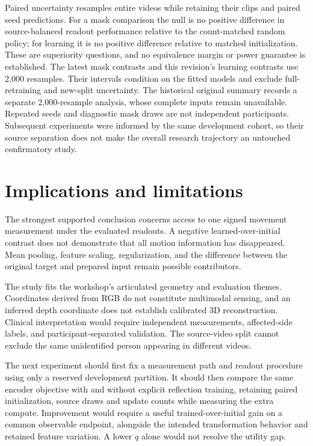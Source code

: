 \documentclass{article}
\begin{document}
Paired uncertainty resamples entire videos while retaining their clips and paired seed predictions. For a mask comparison the null is no positive difference in source-balanced readout performance relative to the count-matched random policy; for learning it is no positive difference relative to matched initialization. These are superiority questions, and no equivalence margin or power guarantee is established. The latest mask contrasts and this revision's learning contrasts use 2,000 resamples. Their intervals condition on the fitted models and exclude full-retraining and new-split uncertainty. The historical original summary records a separate 2,000-resample analysis, whose complete inputs remain unavailable. Repeated seeds and diagnostic mask draws are not independent participants. Subsequent experiments were informed by the same development cohort, so their source separation does not make the overall research trajectory an untouched confirmatory study.

\section{Implications and limitations}\label{implications-and-limitations}

The strongest supported conclusion concerns access to one signed movement measurement under the evaluated readouts. A negative learned-over-initial contrast does not demonstrate that all motion information has disappeared. Mean pooling, feature scaling, regularization, and the difference between the original target and prepared input remain possible contributors.

The study fits the workshop's articulated geometry and evaluation themes. Coordinates derived from RGB do not constitute multimodal sensing, and an inferred depth coordinate does not establish calibrated 3D reconstruction. Clinical interpretation would require independent measurements, affected-side labels, and participant-separated validation. The source-video split cannot exclude the same unidentified person appearing in different videos.

The next experiment should first fix a measurement path and readout procedure using only a reserved development partition. It should then compare the same encoder objective with and without explicit reflection training, retaining paired initialization, source draws and update counts while measuring the extra compute. Improvement would require a useful trained-over-initial gain on a common observable endpoint, alongside the intended transformation behavior and retained feature variation. A lower \(q\) alone would not resolve the utility gap.
\end{document}
